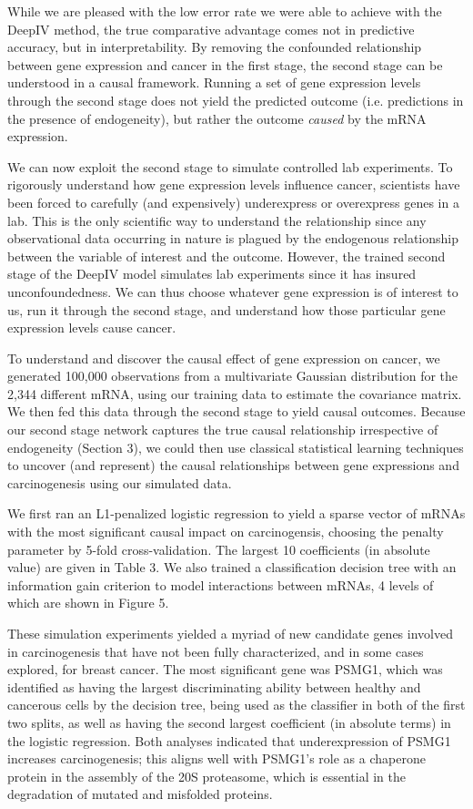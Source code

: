 \documentclass[10.5pt, oneside, twocolumn]{article}   	%
\begin{document}
While we are pleased with the low error rate we were able to achieve with the DeepIV method, the true comparative advantage comes not in predictive accuracy, but in interpretability. By removing the confounded relationship between gene expression and cancer in the first stage, the second stage can be understood in a causal framework. Running a set of gene expression levels through the second stage does not yield the predicted outcome (i.e. predictions in the presence of endogeneity), but rather the outcome \textit{caused} by the mRNA expression. 

We can now exploit the second stage to simulate controlled lab experiments. To rigorously understand how gene expression levels influence cancer, scientists have been forced to carefully (and expensively) underexpress or overexpress genes in a lab. This is the only scientific way to understand the relationship since any observational data occurring in nature is plagued by the endogenous relationship between the variable of interest and the outcome. However, the trained second stage of the DeepIV model simulates lab experiments since it has insured unconfoundedness. We can thus choose whatever gene expression is of interest to us, run it through the second stage, and understand how those particular gene expression levels cause cancer. 

To understand and discover the causal effect of gene expression on cancer, we generated 100,000 observations from a multivariate Gaussian distribution for the 2,344 different mRNA, using our training data to estimate the covariance matrix. We then fed this data through the second stage to yield causal outcomes. Because our second stage network captures the true causal relationship irrespective of endogeneity (Section 3), we could then use classical statistical learning techniques to uncover (and represent) the causal relationships between gene expressions and carcinogenesis using our simulated data.

We first ran an L1-penalized logistic regression to yield a sparse vector of mRNAs with the most significant causal impact on carcinogensis, choosing the penalty parameter by 5-fold cross-validation. The largest 10 coefficients (in absolute value) are given in Table 3. We also trained a classification decision tree with an information gain criterion to model interactions between mRNAs, 4 levels of which are shown in Figure 5.

These simulation experiments yielded a myriad of new candidate genes involved in carcinogenesis that have not been fully characterized, and in some cases explored, for breast cancer. The most significant gene was PSMG1, which was identified as having the largest discriminating ability between healthy and cancerous cells by the decision tree, being used as the classifier in both of the first two splits, as well as having the second largest coefficient (in absolute terms) in the logistic regression. Both analyses indicated that underexpression of PSMG1 increases carcinogenesis; this aligns well with PSMG1’s role as a chaperone protein in the assembly of the 20S proteasome, which is essential in the degradation of mutated and misfolded proteins\cite{vidal1998identification}. \\
\end{document}
